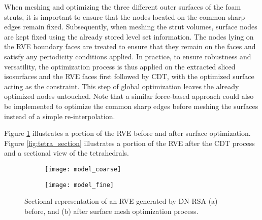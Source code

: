 When meshing and optimizing the three different outer surfaces of the foam struts, it is important to ensure that the nodes located on the common sharp edges remain fixed. Subsequently, when meshing the strut volumes, surface nodes are kept fixed using the already stored level set information. The nodes lying on the RVE boundary faces are treated to ensure that they remain on the faces and satisfy any periodicity conditions applied. In practice, to ensure robustness and versatility, the optimization process is thus applied on the extracted sliced isosurfaces and the RVE faces first followed by CDT, with the optimized surface acting as the constraint. This step of global optimization leaves the already optimized nodes untouched. Note that a similar force-based approach could also be implemented to optimize the common sharp edges before meshing the surfaces instead of a simple re-interpolation. 


Figure \ref{fig:model_smooth} illustrates a portion of the RVE before and after surface optimization. Figure \ref{fig:tetra_section} illustrates a portion of the RVE after the CDT process and a sectional view of the tetrahedrals.  

\begin{figure}
	\centering
	\begin{subfigure}[b]{0.45\textwidth}
		\texttt{[image: model\_coarse]}
		\caption{}
	\end{subfigure}
	\begin{subfigure}[b]{0.45\textwidth}
		\texttt{[image: model\_fine]}
		\caption{}
	\end{subfigure}
	\caption{Sectional representation of an RVE generated by DN-RSA (a) before, and (b) after surface mesh optimization process.}\label{fig:model_smooth}
\end{figure}

